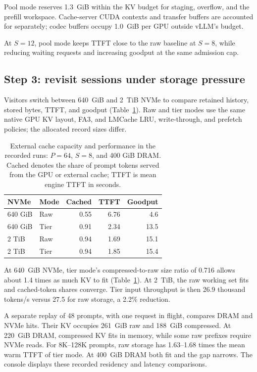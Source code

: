 \documentclass[conference]{IEEEtran}
\begin{document}
Pool mode reserves 1.3~GiB within the KV budget for staging, overflow, and
the prefill workspace. Cache-server CUDA contexts and transfer buffers are
accounted for separately; codec buffers occupy 1.0~GiB per GPU outside
vLLM's budget.

At $S=12$, pool mode keeps TTFT close to the raw baseline at $S=8$,
while reducing waiting requests and increasing goodput at the same
admission cap.

\subsection{Step 3: revisit sessions under storage pressure}
Visitors switch between 640~GiB and 2~TiB NVMe to compare retained
history, stored bytes, TTFT, and goodput (Table~\ref{tab:tiers}). Raw and tier
modes use the same native GPU KV layout, FA3, and LMCache LRU, write-through,
and prefetch policies; the allocated record sizes differ.

\begin{table}[t]
\centering
\caption{External cache capacity and performance in the recorded runs:
$P=64$, $S=8$, and 400 GiB DRAM. Cached denotes the share of prompt tokens
served from the GPU or external cache; TTFT is mean engine TTFT in seconds.}
\label{tab:tiers}
\small
\setlength{\tabcolsep}{3pt}
\begin{tabular*}{\columnwidth}{@{\extracolsep{\fill}}llrrr@{}}
\toprule
NVMe & Mode & Cached & TTFT & Goodput \\
\midrule
640 GiB & Raw  & 0.55 & 6.76 & 4.6 \\
640 GiB & Tier & 0.91 & 2.34 & 13.5 \\
2 TiB   & Raw  & 0.94 & 1.69 & 15.1 \\
2 TiB   & Tier & 0.94 & 1.85 & 15.4 \\
\bottomrule
\end{tabular*}
\end{table}

At 640~GiB NVMe, tier mode's compressed-to-raw size ratio of 0.716 allows
about 1.4 times as much KV to fit (Table~\ref{tab:tiers}). At 2~TiB, the raw
working set fits and cached-token shares converge. Tier input throughput
is then 26.9 thousand tokens/s versus 27.5 for raw storage, a 2.2\% reduction.

A separate replay of 48 prompts, with one request in flight, compares DRAM
and NVMe hits. Their KV occupies 261~GiB raw and 188~GiB compressed. At
220~GiB DRAM, compressed KV fits in memory, while some raw prefixes require
NVMe reads. For 8K--128K prompts, raw storage has 1.63--1.68 times the mean
warm TTFT of tier mode. At 400~GiB DRAM both fit and the gap narrows.
The console displays these recorded residency and latency comparisons.
\end{document}
